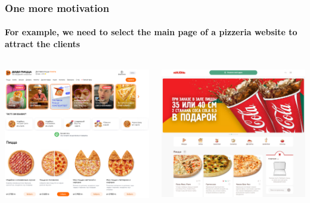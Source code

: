 \documentclass[fullscreen=true, bookmarks=true, hyperref={pdfencoding=unicode}]{beamer}
\begin{document}
\begin{frame}
  \frametitle{One more motivation}
  \framesubtitle{For example, we need to select the main page of a pizzeria website to attract the clients}

  \begin{columns}
      \begin{column}{.5\paperwidth}
        \begin{center}
          \includegraphics[keepaspectratio,
                           height=.45\paperheight]{pizza-1.png}
        \end{center}
      \end{column}
      \begin{column}{.5\paperwidth}
        \begin{center}
          \includegraphics[keepaspectratio,
                           height=.4\paperwidth]{pizza-2.png}
        \end{center}
      \end{column}
  \end{columns}
\end{frame}
\end{document}

